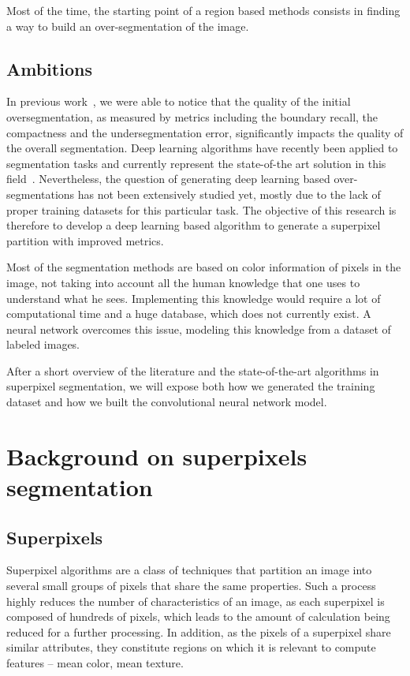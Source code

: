 \documentclass{article}
\begin{document}
        Most of the time, the starting point of a region based methods consists in finding a way to build an over-segmentation of the image.

    \subsection{Ambitions}
        In previous work~\cite{chang2019}, we were able to notice that the quality of the initial oversegmentation, as measured by metrics including the boundary recall, the compactness and the undersegmentation error, significantly impacts the quality of the overall segmentation.
        Deep learning algorithms have recently been applied to segmentation tasks and currently represent the state-of-the art solution in this field~\cite{unet2015,long2015}. Nevertheless, the question of generating deep learning based over-segmentations has not been extensively studied yet, mostly due to the lack of proper training datasets for this particular task.
        The objective of this research is therefore to develop a deep learning based algorithm to generate a superpixel partition with improved metrics.
        \par
        Most of the segmentation methods are based on color information of pixels in the image, not taking into account all the human knowledge that one uses to understand what he sees. Implementing this knowledge would require a lot of computational time and a huge database, which does not currently exist. A neural network overcomes this issue, modeling this knowledge from a dataset of labeled images.
        \par
        After a short overview of the literature and the state-of-the-art algorithms in superpixel segmentation, we will expose both how we generated the training dataset and how we built the convolutional neural network model.

\newpage
\section{Background on superpixels segmentation}

    \subsection{Superpixels}
        Superpixel algorithms are a class of techniques that partition an image into several small groups of pixels that share the same properties. Such a process highly reduces the number of characteristics of an image, as each superpixel is composed of hundreds of pixels, which leads to the amount of calculation being reduced for a further processing. In addition, as the pixels of a superpixel share similar attributes, they constitute regions on which it is relevant to compute features -- mean color, mean texture.
\end{document}
